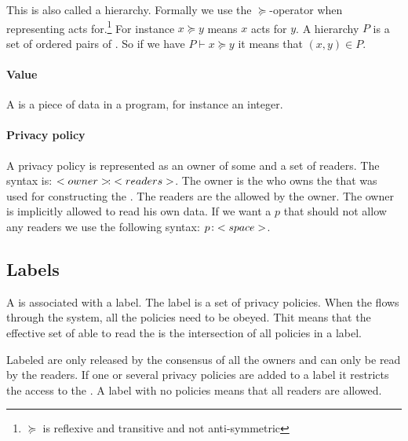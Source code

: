 This is also called a \principal{} hierarchy.
Formally we use the $\succeq$-operator when representing acts for.\footnote{$\succeq$ is reflexive and transitive and not anti-symmetric}
For instance $x \succeq y$ means $x$ acts for $y$.
A \principal{} hierarchy $P$ is a set of ordered pairs of \principals{}.
So if we have $P \vdash x \succeq y$ it means that $(x,y) \in P$.

\paragraph{Value}
A \xvalue{} is a piece of data in a program, for instance an integer.

\paragraph{Privacy policy}
A privacy policy is represented as an owner of some \xvalue{} and a set of readers.
The syntax is: $<owner>\!:\;<readers>$.
The owner is the \principal{} who owns the \xvalue{} that was used for constructing the \xvalue{}.
The readers are the \principals{} allowed by the owner.
The owner is implicitly allowed to read his own data.
If we want a \principal{} $p$ that should not allow any readers we use the following syntax: $p\!:\;<space>$.

\subsection{Labels}
A \xvalue{} is associated with a label.
The label is a set of privacy policies.
When the \xvalue{} flows through the system, all the policies need to be obeyed.
Thit means that the effective set of \principals{} able to read the \xvalue{} is the intersection of all policies in a label.


Labeled \xvalues{} are only released by the consensus of all the owners and can only be read by the readers.
If one or several privacy policies are added to a label it restricts the access to the \xvalue{}.
A label with no policies  means that all readers are allowed.

